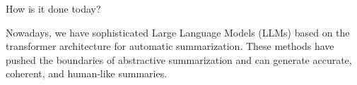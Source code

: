 \begin{frame}{How is it done today?}

Nowadays, we have sophisticated Large Language Models (LLMs) based on the
transformer architecture for automatic summarization.
These methods have pushed the boundaries of abstractive summarization and can
generate accurate, coherent, and human-like summaries.


\vskip 1.3cm


\end{frame}
